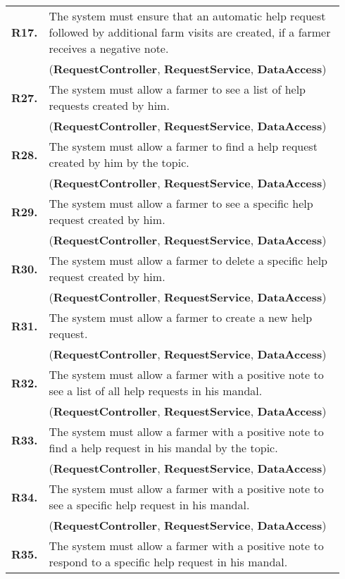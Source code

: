 \begin{longtable}{p{0.06\linewidth} p{0.88\linewidth}}
    \textbf{R17.} & The system must ensure that an automatic help request followed by additional farm visits are created, if a farmer receives a negative note.\\
    & (\textbf{RequestController}, \textbf{RequestService}, \textbf{DataAccess})\\
	
	\textbf{R27.} & The system must allow a farmer to see a list of help requests created by him.\\
	& (\textbf{RequestController}, \textbf{RequestService}, \textbf{DataAccess})\\
	\textbf{R28.} & The system must allow a farmer to find a help request created by him by the topic.\\
	& (\textbf{RequestController}, \textbf{RequestService}, \textbf{DataAccess})\\
	\textbf{R29.} & The system must allow a farmer to see a specific help request created by him.\\
	& (\textbf{RequestController}, \textbf{RequestService}, \textbf{DataAccess})\\
	\textbf{R30.} & The system must allow a farmer to delete a specific help request created by him.\\
	& (\textbf{RequestController}, \textbf{RequestService}, \textbf{DataAccess})\\
	\textbf{R31.} & The system must allow a farmer to create a new help request.\\
	& (\textbf{RequestController}, \textbf{RequestService}, \textbf{DataAccess})\\
	\textbf{R32.} & The system must allow a farmer with a positive note to see a list of all help requests in his mandal.\\
	& (\textbf{RequestController}, \textbf{RequestService}, \textbf{DataAccess})\\
	\textbf{R33.} & The system must allow a farmer with a positive note to find a help request in his mandal by the topic.\\
	& (\textbf{RequestController}, \textbf{RequestService}, \textbf{DataAccess})\\
	\textbf{R34.} & The system must allow a farmer with a positive note to see a specific help request in his mandal.\\
	& (\textbf{RequestController}, \textbf{RequestService}, \textbf{DataAccess})\\
	\textbf{R35.} & The system must allow a farmer with a positive note to respond to a specific help request in his mandal.\\

\end{longtable}
